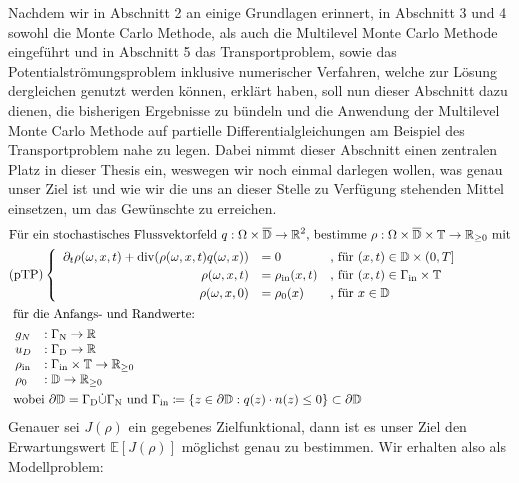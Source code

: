Nachdem wir in Abschnitt 2 an einige Grundlagen erinnert, in Abschnitt 3 und 4 sowohl die Monte Carlo Methode, als auch die Multilevel Monte Carlo Methode eingeführt und in Abschnitt 5 das Transportproblem, sowie das Potentialströmungsproblem inklusive numerischer Verfahren, welche zur Lösung dergleichen genutzt werden können, erklärt haben, soll nun dieser Abschnitt dazu dienen, die bisherigen Ergebnisse zu bündeln und die Anwendung der Multilevel Monte Carlo Methode auf partielle Differentialgleichungen am Beispiel des Transportproblem nahe zu legen. Dabei nimmt dieser Abschnitt einen zentralen Platz in dieser Thesis ein, weswegen wir noch einmal darlegen wollen, was genau unser Ziel ist und wie wir die uns an dieser Stelle zu Verfügung stehenden Mittel einsetzen, um das Gewünschte zu erreichen.
\begin{align*}
&\text{Für ein stochastisches Flussvektorfeld } q: \Omega \times \overline{\mathbb{D}} \to \R^2 \text{, bestimme }\rho: \Omega \times \overline{\mathbb{D}} \times \mathbb{T} \to \R_{\geq 0} \text{ mit} \\
&\text{(pTP)} 
\begin{cases}
\begin{array}{rlll}
\partial_t \rho (\omega, x, t) + \dive(\rho(\omega,x,t)q(\omega,x)) &= 0 &\text{, für } (x,t) \in \mathbb{D} \times (0,T] \\
\rho(\omega,x,t) &= \rho_{\text{in}}(x,t) &\text{, für } (x,t) \in \Gamma_{\text{in}} \times \mathbb{T} \\
\rho(\omega,x,0)  &= \rho_0(x) &\text{, für } x \in  \mathbb{D}
\end{array}
\end{cases} \\
&\text{ für die Anfangs- und Randwerte: } \\ 
&\begin{array}{llr}
g_N&: \Gamma_{\text{N}} \to \R \\
u_D&: \Gamma_{\text{D}} \to \R \\
\rho_{\text{in}}&: \Gamma_{\text{in}} \times \mathbb{T} \to \R_{\geq0} \\
\rho_0&: \mathbb{D} \to \R_{\geq0} \\
\end{array} \newline \\
&\text{ wobei } \partial \mathbb{D} = \Gamma_{\text{D}} \dot{\cup} \Gamma_{\text{N}}  \text{ und }  \Gamma_{\text{in}} \coloneqq  \{ z \in \partial \mathbb{D}: q(z)\cdot n(z) \leq 0 \} \subset  \partial \mathbb{D}
\end{align*}
Genauer sei $ J(\rho) $ ein gegebenes Zielfunktional, dann ist es unser Ziel den Erwartungswert $ \mathbb{E}[J(\rho)] $ möglichst genau zu bestimmen. 
Wir erhalten also als Modellproblem:

